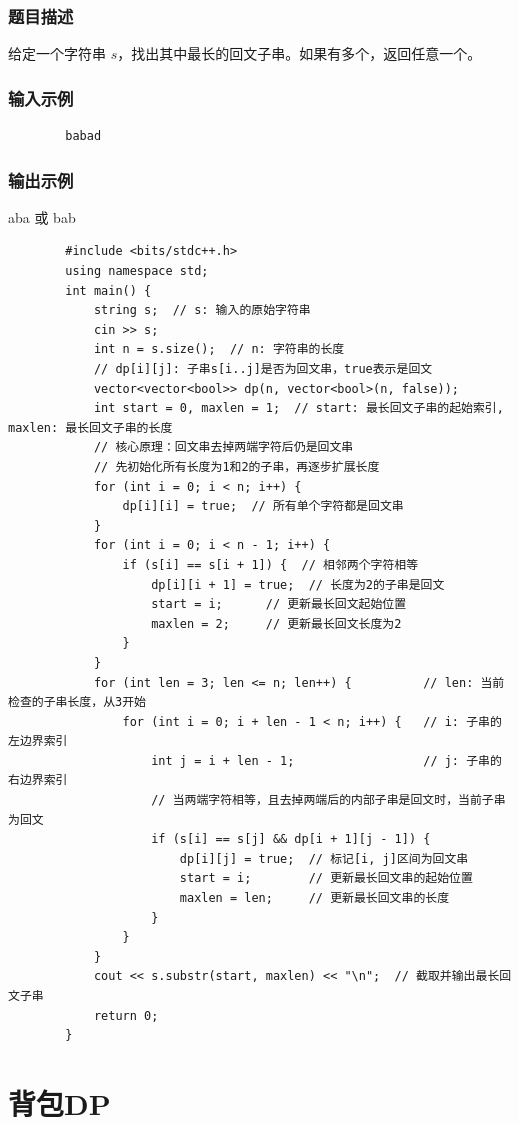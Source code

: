 \documentclass[12pt,a4paper]{ctexart}
\begin{document}
	\subsubsection*{题目描述}
	给定一个字符串 \(s\)，找出其中最长的回文子串。如果有多个，返回任意一个。
	
	\subsubsection*{输入示例}
	\begin{verbatim}
		babad
	\end{verbatim}
	
	\subsubsection*{输出示例}
	aba 或 bab
	
	\begin{lstlisting}
		#include <bits/stdc++.h>
		using namespace std;
		int main() {
			string s;  // s: 输入的原始字符串
			cin >> s;
			int n = s.size();  // n: 字符串的长度
			// dp[i][j]: 子串s[i..j]是否为回文串，true表示是回文
			vector<vector<bool>> dp(n, vector<bool>(n, false));
			int start = 0, maxlen = 1;  // start: 最长回文子串的起始索引, maxlen: 最长回文子串的长度
			// 核心原理：回文串去掉两端字符后仍是回文串
			// 先初始化所有长度为1和2的子串，再逐步扩展长度
			for (int i = 0; i < n; i++) {
				dp[i][i] = true;  // 所有单个字符都是回文串
			}
			for (int i = 0; i < n - 1; i++) {
				if (s[i] == s[i + 1]) {  // 相邻两个字符相等
					dp[i][i + 1] = true;  // 长度为2的子串是回文
					start = i;      // 更新最长回文起始位置
					maxlen = 2;     // 更新最长回文长度为2
				}
			}
			for (int len = 3; len <= n; len++) {          // len: 当前检查的子串长度，从3开始
				for (int i = 0; i + len - 1 < n; i++) {   // i: 子串的左边界索引
					int j = i + len - 1;                  // j: 子串的右边界索引
					// 当两端字符相等，且去掉两端后的内部子串是回文时，当前子串为回文
					if (s[i] == s[j] && dp[i + 1][j - 1]) {
						dp[i][j] = true;  // 标记[i, j]区间为回文串
						start = i;        // 更新最长回文串的起始位置
						maxlen = len;     // 更新最长回文串的长度
					}
				}
			}
			cout << s.substr(start, maxlen) << "\n";  // 截取并输出最长回文子串
			return 0;
		}
	\end{lstlisting}
	
	\newpage
	
	\section{背包DP}
	
\end{document}
